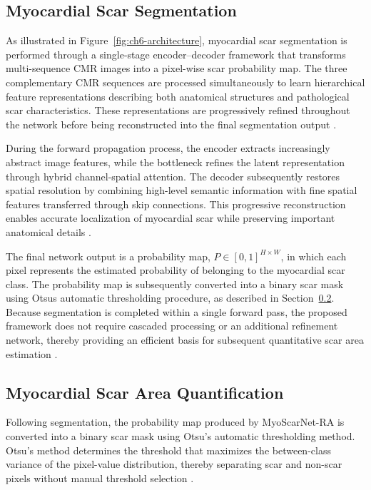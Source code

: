 \subsection{Myocardial Scar Segmentation}
\label{subsec:ch6-segmentation}

As illustrated in Figure~\ref{fig:ch6-architecture}, myocardial scar segmentation is performed through a single-stage encoder--decoder framework that transforms multi-sequence CMR images into a pixel-wise scar probability map. The three complementary CMR sequences are processed simultaneously to learn hierarchical feature representations describing both anatomical structures and pathological scar characteristics. These representations are progressively refined throughout the network before being reconstructed into the final segmentation output \citep{Riandini2026Access}.

During the forward propagation process, the encoder extracts increasingly abstract image features, while the bottleneck refines the latent representation through hybrid channel-spatial attention. The decoder subsequently restores spatial resolution by combining high-level semantic information with fine spatial features transferred through skip connections. This progressive reconstruction enables accurate localization of myocardial scar while preserving important anatomical details \citep{Ronneberger2015,Riandini2026Access}.

The final network output is a probability map, $P \in [0,1]^{H \times W}$, in which each pixel represents the estimated probability of belonging to the myocardial scar class. The probability map is subsequently converted into a binary scar mask using Otsu\textquotesingle s automatic thresholding procedure, as described in Section~\ref{subsec:ch6-area-method}. Because segmentation is completed within a single forward pass, the proposed framework does not require cascaded processing or an additional refinement network, thereby providing an efficient basis for subsequent quantitative scar area estimation \citep{Otsu1979,Riandini2026Access}.

\subsection{Myocardial Scar Area Quantification}
\label{subsec:ch6-area-method}

Following segmentation, the probability map produced by MyoScarNet-RA is converted into a binary scar mask using Otsu's automatic thresholding method. Otsu's method determines the threshold that maximizes the between-class variance of the pixel-value distribution, thereby separating scar and non-scar pixels without manual threshold selection \citep{Otsu1979}.

